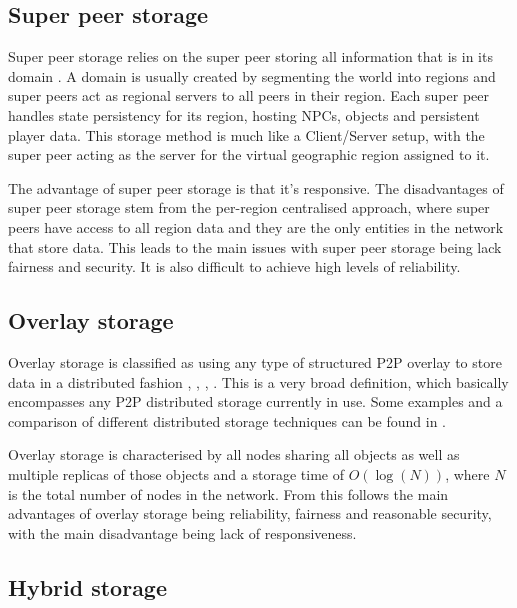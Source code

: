 \documentclass[10pt,a4paper,conference]{IEEEtran}
\begin{document}
\subsection{Super peer storage}

Super peer storage relies on the super peer storing all information that is in its domain \cite{knutsson_p2p_first}. A domain is usually created by
segmenting the world into regions and super peers act as regional servers to all peers in their region. Each super peer handles state persistency for
its region, hosting NPCs, objects and persistent player data. This storage method is much like a Client/Server setup, with the super peer acting as
the server for the virtual geographic region assigned to it.

The advantage of super peer storage is that it's responsive. The disadvantages of super peer storage stem from the per-region centralised approach,
where super peers have access to all region data and they are the only entities in the network that store data. This leads to the main issues with
super peer storage being lack fairness and security. It is also difficult to achieve high levels of reliability.


\subsection{Overlay storage}

Overlay storage is classified as using any type of structured P2P overlay to store data in a distributed fashion \cite{Douglas05enablingmassively},
\cite{using_freenet_storage}, \cite{Fan_phd}, \cite{past_storage_focus}. This is a very broad definition, which basically encompasses any P2P
distributed storage currently in use. Some examples and a comparison of different distributed storage techniques can be found in
\cite{Hasan_distributed_storage_survey}.

Overlay storage is characterised by all nodes sharing all objects as well as multiple replicas of those objects and a storage time of $O(\log(N))$,
where $N$ is the total number of nodes in the network. From this follows the main advantages of overlay storage being reliability, fairness and
reasonable security, with the main disadvantage being lack of responsiveness.

\subsection{Hybrid storage}
\end{document}
